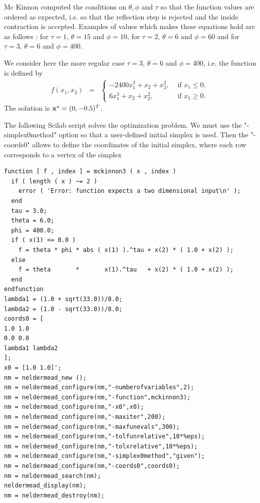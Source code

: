 Mc Kinnon computed the conditions on $\theta,\phi$ and $\tau$
so that the function values are ordered as expected, i.e. so that the 
reflection step is rejected and the inside contraction is accepted.
Examples of values which makes these equations hold are as follows :
for $\tau=1$, $\theta=15$ and $\phi = 10$, 
for $\tau=2$, $\theta=6$ and $\phi = 60$ and
for $\tau=3$, $\theta=6$ and $\phi = 400$.

We consider here the more regular case $\tau=3$, $\theta=6$
and $\phi = 400$, i.e. the function is defined by 
\begin{eqnarray}
\label{mckinnon-function3}
f(x_1,x_2) &=& 
\left\{
\begin{array}{ll}
- 2400 x_1^3 + x_2 + x_2^2, & \textrm{ if } x_1\leq 0, \\
6 x_1^3 + x_2 + x_2^2, & \textrm{ if } x_1\geq 0.
\end{array}
\right.
\end{eqnarray}
The solution is $\mathbf{x}^\star = (0 , -0.5 )^T$.

The following Scilab script solves the optimization problem.
We must use the "-simplex0method" option so that a 
user-defined initial simplex is used. Then the 
"-coords0" allows to define the coordinates of the initial 
simplex, where each row corresponds to a vertex of the simplex

\lstset{language=scilabscript}
\begin{lstlisting}
function [ f , index ] = mckinnon3 ( x , index )
  if ( length ( x ) ~= 2 )
    error ( 'Error: function expects a two dimensional input\n' );
  end
  tau = 3.0;
  theta = 6.0;
  phi = 400.0;
  if ( x(1) <= 0.0 )
    f = theta * phi * abs ( x(1) ).^tau + x(2) * ( 1.0 + x(2) );
  else
    f = theta       *       x(1).^tau   + x(2) * ( 1.0 + x(2) );
  end
endfunction
lambda1 = (1.0 + sqrt(33.0))/8.0;
lambda2 = (1.0 - sqrt(33.0))/8.0;
coords0 = [
1.0 1.0
0.0 0.0
lambda1 lambda2
];
x0 = [1.0 1.0]';
nm = neldermead_new ();
nm = neldermead_configure(nm,"-numberofvariables",2);
nm = neldermead_configure(nm,"-function",mckinnon3);
nm = neldermead_configure(nm,"-x0",x0);
nm = neldermead_configure(nm,"-maxiter",200);
nm = neldermead_configure(nm,"-maxfunevals",300);
nm = neldermead_configure(nm,"-tolfunrelative",10*%eps);
nm = neldermead_configure(nm,"-tolxrelative",10*%eps);
nm = neldermead_configure(nm,"-simplex0method","given");
nm = neldermead_configure(nm,"-coords0",coords0);
nm = neldermead_search(nm);
neldermead_display(nm);
nm = neldermead_destroy(nm);
\end{lstlisting}


